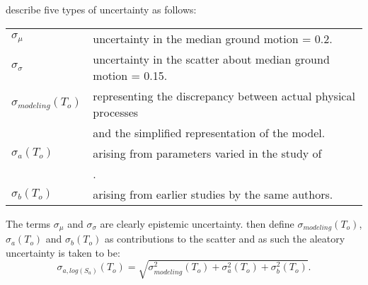\cite{dr_Somerville01a} describe five types of uncertainty as
follows:

\begin{supertabular}{ll}
$\sigma_{\mu}$ & uncertainty in the median ground motion = 0.2. \\
$\sigma_{\sigma}$ & uncertainty in the scatter about median ground motion = 0.15. \\
$\sigma_{modeling}(T_o)$ & representing the discrepancy between
actual
physical processes \\
  & and the simplified representation of the model.\\
$\sigma_a(T_o)$ & arising from parameters varied in the study of \\
 & \cite{dr_Somerville01a}. \\
$\sigma_b(T_o)$ & arising from earlier studies by the same
authors.\\
\end{supertabular}

The terms $\sigma_{\mu}$ and $\sigma_{\sigma}$ are clearly
epistemic uncertainty. \cite{dr_Somerville01a} then define
$\sigma_{modeling}(T_o)$, $\sigma_a(T_o)$ and $\sigma_b(T_o)$ as
contributions to the scatter and as such the aleatory uncertainty
is taken to be:
\begin{equation}
\sigma_{a,log(S_a)}(T_o) = \sqrt{
\sigma_{modeling}^2(T_o)+\sigma_a^2(T_o)+\sigma_b^2(T_o) }.
\end{equation}

\
\eject




